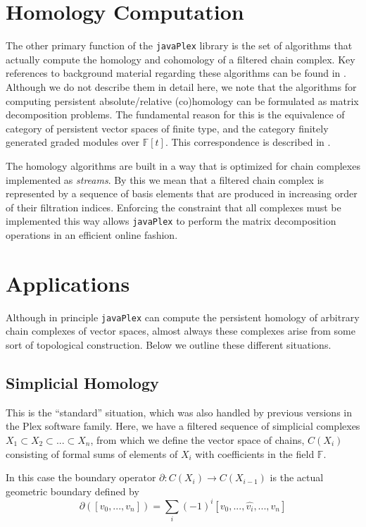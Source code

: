 \documentclass{gts2012}
\newcommand\javaPlex{\texttt{javaPlex}\xspace}
\begin{document}
\section{Homology Computation}

The other primary function of the \javaPlex library is the set of algorithms that actually compute the homology and cohomology of a filtered chain complex. Key references to background material regarding these algorithms can be found in \cite{Carlsson_04, Dualities}. Although we do not describe them in detail here, we note that the algorithms for computing persistent absolute/relative (co)homology can be formulated as matrix decomposition problems. The fundamental reason for this is the equivalence of category of persistent vector spaces of finite type, and the category finitely generated graded modules over $\mathbb{F}[t]$. This correspondence is described in \cite{Carlsson_04}. 

The homology algorithms are built in a way that is optimized for chain complexes implemented as \emph{streams}. By this we mean that a filtered chain complex is represented by a sequence of basis elements that are produced in increasing order of their filtration indices. Enforcing the constraint that all complexes must be implemented this way allows \javaPlex to perform the matrix decomposition operations in an efficient online fashion.

\section{Applications}

Although in principle \javaPlex can compute the persistent homology of arbitrary chain complexes of vector spaces, almost always these complexes arise from some sort of topological construction. Below we outline these different situations.

\subsection{Simplicial Homology}

This is the ``standard'' situation, which was also handled by previous versions in the Plex software family. Here, we have a filtered sequence of simplicial complexes $X_1 \subset X_2 \subset ... \subset X_n$, from which we define the vector space of chains, $C(X_i)$ consisting of formal sums of elements of $X_i$ with coefficients in the field $\mathbb{F}$.

In this case the boundary operator $\partial: C(X_i) \rightarrow C(X_{i-1})$ is the actual geometric boundary defined by
$$\partial([v_0, ..., v_n]) = \sum_i (-1)^i [v_0, ..., \hat{v_i}, ..., v_n]$$
\end{document}
